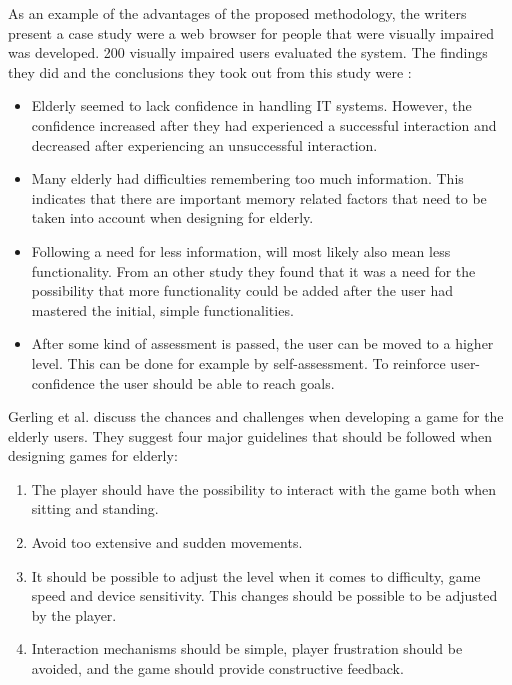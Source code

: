 As an example of the advantages of the proposed methodology, the writers present a case study were a  web browser for people that were visually impaired was developed. 200 visually impaired users evaluated the system.  The findings they did and the conclusions they took out from this study were \cite{gregor}: 
\begin{itemize}
\item Elderly seemed to lack confidence in handling IT systems. However, the confidence increased after they had experienced a successful interaction and decreased after experiencing an unsuccessful interaction.
\item Many elderly had difficulties remembering too much information. This indicates that there are important memory related factors that need to be taken into account when designing for elderly. 
\item Following a need for less information, will most likely also mean less functionality. From an other study they found that it was a need for the possibility that more functionality could be added after the user had mastered the initial, simple functionalities.
\item After some kind of assessment is passed, the user can be moved to a higher level. This can be done for example by self-assessment. To reinforce user-confidence the user should be able to reach goals. 
\end{itemize}

Gerling et al. \cite{gerling1} discuss the chances and challenges when developing a game for the elderly users. They suggest four major guidelines that should be followed when designing games for elderly:
\begin{enumerate}
\item The player should have the possibility to interact with the game both when sitting and standing. 
\item Avoid too extensive and sudden movements.
\item It should be possible to adjust the level when it comes to difficulty, game speed and device sensitivity. This changes should be possible to be adjusted by the player. 
\item Interaction mechanisms should be simple, player frustration should be avoided, and the game should provide constructive feedback.
\end{enumerate}

